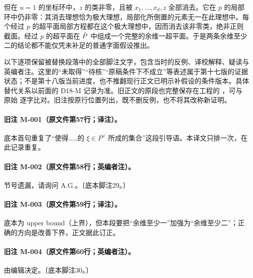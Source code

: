 但在 $u=1$ 的坐标环中，$z$ 的类非零，且被 $x_1,\ldots,x_d,z$ 全部消去。它在 $p$ 的局部环中仍非零：其消去理想恰为极大理想，局部化所倒置的元素无一在此理想中。每个经过 $p$ 的超平面局部方程都在这个极大理想中，因而消去该非零类，绝非正则截面。经过 $p$ 的超平面在 $\PD$ 中组成一个完整的余维一超平面。于是两条余维至少二的结论都不能仅凭未补足的普通字面假设推出。

\endgroup

以下逐项保留被替换段落中的全部脚注文字，包含当时的反例、译校解释、疑读与英编者注。这里的“未取得”“待核”“原稿条件下不成立”等表述属于第十七版的证据状态；不是第十八版当前进度，也不推翻现行正文已明示补假设的条件版本。具体替代关系以前面的 D18-M 记录为准。旧正文的原段也完整保存在工程的 ，可与原始  逐字比对。旧注按原行位置列出，既不删反例，也不将其改称新证明。


\begingroup
\def\PP{\mathbb P}\def\OO{\mathcal O}\def\Ocal{\mathcal O}
\def\F{\mathcal F}\def\G{\mathcal G}\def\N{\mathcal N}
\def\PD{\check P}\def\Pdual{\check P}
\def\Ys{Y^{\mathrm{sing}}}\def\Ysing{Y^{\mathrm{sing}}}
\def\Ds{Y^{\mathrm{sup\,sing}}}\def\Ysup{Y^{\mathrm{sup\,sing}}}
\def\cod{\operatorname{codim}}\def\Sing{\operatorname{Sing}}
\def\depth{\operatorname{depth}}\def\coprof{\operatorname{coprof}}
\def\Ass{\operatorname{Ass}}\def\Supp{\operatorname{Supp}}
\def\Gr{\operatorname{Gr}}\def\Spec{\operatorname{Spec}}\def\Proj{\operatorname{Proj}}


\paragraph{旧注 M-001（原文件第57行；译注）。}
底本首句重复了“使得……的 $\xi\in P^\vee$ 所成的集合”这段引导语。本译文只排一次，在此记录重复。

\paragraph{旧注 M-002（原文件第58行；英编者注）。}
节号遗漏，请询问 A.G.。〔底本脚注29。〕

\paragraph{旧注 M-003（原文件第59行；译注）。}
底本为 upper bound（上界），但本段要把“余维至少一”加强为“余维至少二”；正确的方向是改善下界，正文据此订正。

\paragraph{旧注 M-004（原文件第60行；英编者注）。}
由编辑决定。〔底本脚注30。〕

